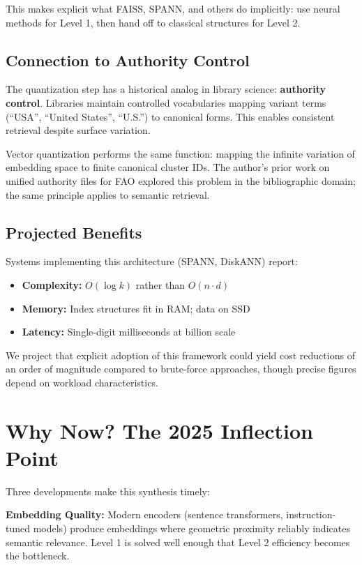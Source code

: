 \documentclass[manuscript,screen,nonacm]{acmart}
\begin{document}
This makes explicit what FAISS, SPANN, and others do implicitly: use neural methods for Level 1, then hand off to classical structures for Level 2.

\subsection{Connection to Authority Control}

The quantization step has a historical analog in library science: \textbf{authority control}. Libraries maintain controlled vocabularies mapping variant terms (``USA'', ``United States'', ``U.S.'') to canonical forms. This enables consistent retrieval despite surface variation.

Vector quantization performs the same function: mapping the infinite variation of embedding space to finite canonical cluster IDs. The author's prior work on unified authority files for FAO \cite{caprazli2003} explored this problem in the bibliographic domain; the same principle applies to semantic retrieval.

\subsection{Projected Benefits}

Systems implementing this architecture (SPANN, DiskANN) report:
\begin{itemize}
    \item \textbf{Complexity:} $O(\log k)$ rather than $O(n \cdot d)$
    \item \textbf{Memory:} Index structures fit in RAM; data on SSD
    \item \textbf{Latency:} Single-digit milliseconds at billion scale
\end{itemize}

We project that explicit adoption of this framework could yield cost reductions of an order of magnitude compared to brute-force approaches, though precise figures depend on workload characteristics.

\section{Why Now? The 2025 Inflection Point}

Three developments make this synthesis timely:

\textbf{Embedding Quality:} Modern encoders (sentence transformers, instruction-tuned models) produce embeddings where geometric proximity reliably indicates semantic relevance. Level 1 is solved well enough that Level 2 efficiency becomes the bottleneck.
\end{document}

